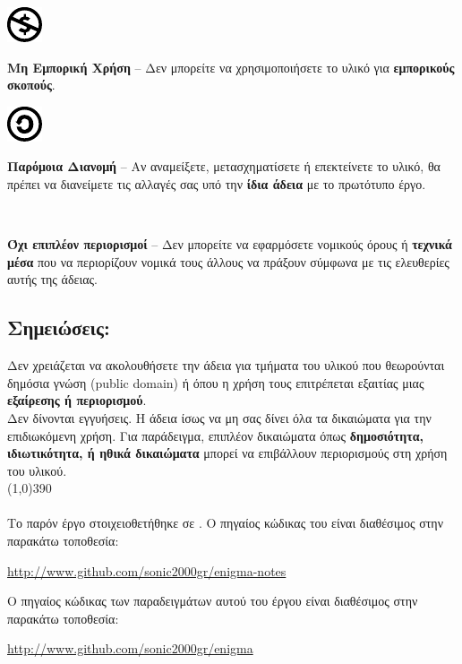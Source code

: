 \vspace{1em}
\noindent
\parbox{1.5cm}{\includegraphics[scale=0.15]{images/license/cc_nc_30}}
\parbox{10.5cm}{\textbf{Μη Εμπορική Χρήση} --  Δεν μπορείτε να χρησιμοποιήσετε το υλικό για \textbf{εμπορικούς σκοπούς}.}

\vspace{1em}
\noindent
\parbox{1.5cm}{\includegraphics[scale=0.15]{images/license/cc_sa_30}}
\parbox{10.5cm}{\textbf{Παρόμοια Διανομή}  -- Αν αναμείξετε, μετασχηματίσετε ή επεκτείνετε το υλικό, θα πρέπει να διανείμετε τις αλλαγές σας υπό την \textbf{ίδια άδεια} με το πρωτότυπο έργο.}

\vspace{1em}
\noindent
\parbox{1.5cm}{\ }
\parbox{10.5cm}{\textbf{Όχι επιπλέον περιορισμοί} -- Δεν μπορείτε να εφαρμόσετε νομικούς όρους ή \textbf{τεχνικά μέσα} που να περιορίζουν νομικά τους άλλους να πράξουν σύμφωνα με τις ελευθερίες αυτής της άδειας.}
\subsection*{Σημειώσεις:}
\noindent
Δεν χρειάζεται να ακολουθήσετε την άδεια για τμήματα του υλικού που θεωρούνται δημόσια γνώση (public domain) ή όπου η χρήση τους επιτρέπεται εξαιτίας μιας \textbf{εξαίρεσης ή περιορισμού}.\\

\noindent
Δεν δίνονται εγγυήσεις. Η άδεια ίσως να μη σας δίνει όλα τα δικαιώματα για την επιδιωκόμενη χρήση. Για παράδειγμα, επιπλέον δικαιώματα όπως \textbf{δημοσιότητα, ιδιωτικότητα, ή ηθικά δικαιώματα} μπορεί να επιβάλλουν περιορισμούς στη χρήση του υλικού.\\
\line(1,0){390}\\\\
\noindent
Το παρόν έργο στοιχειοθετήθηκε σε \XeLaTeX. Ο πηγαίος κώδικας του είναι διαθέσιμος στην παρακάτω τοποθεσία:
\begin{center}
\url{http://www.github.com/sonic2000gr/enigma-notes}
\end{center}

Ο πηγαίος κώδικας των παραδειγμάτων αυτού του έργου είναι διαθέσιμος στην παρακάτω τοποθεσία:
\begin{center}
\url{http://www.github.com/sonic2000gr/enigma}
\end{center}
\newpage
\tableofcontents
\newpage
